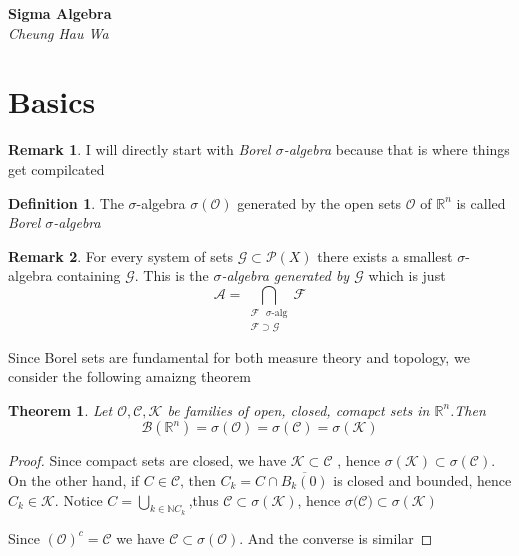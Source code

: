\documentclass{article}
\newtheorem{theorem}{Theorem}[section]
\theoremstyle{definition}
\newtheorem{definition}{Definition}[section]
\theoremstyle{definition}
\newtheorem*{remark}{Remark}
\newcommand{\m}[1]{$ #1 $}
\begin{document}
	

\begin{titlepage}
   \begin{center}
      \Large\textbf{Sigma Algebra}\\
      \large\textit{Cheung Hau Wa}
   \end{center}
\end{titlepage}
\section{Basics}
\begin{remark}
	I will directly start with \textit{Borel $\sigma$-algebra} because that is where things get compilcated
\end{remark}
\begin{definition}
	The $\sigma$-algebra $\sigma(\mathscr{O})$ generated by the open sets $\mathscr{O}$ of $\mathbb{R}^n$ is called \textit{Borel $\sigma$-algebra}
\end{definition}
\begin{remark}
	For every system of sets $\mathscr{G} \subset \mathscr{P}(X)$ there exists a smallest $\sigma$-algebra containing $\mathscr{G}$. This is the \textit{$\sigma$-algebra generated by $\mathscr{G}$} which is just \begin{equation*}
		\mathscr{A} = \bigcap_{\substack{\mathscr{F} \text{ }\sigma\text{-alg} \\ \mathscr{F} \supset \mathscr{G}}} \mathscr{F}
	\end{equation*}
\end{remark}
	
Since Borel sets are fundamental for both measure theory and topology, we consider the following amaizng theorem
\begin{theorem}
	Let $\mathscr{O,C,K}$ be families of open, closed, comapct sets in $\mathbb{R}^n$.Then 
	\begin{equation*}
		\mathscr{B}(\mathbb{R}^n) = \sigma(\mathscr{O}) = \sigma(\mathscr{C}) = \sigma(\mathscr{K})
	\end{equation*}
\end{theorem}
\begin{proof}
	Since compact sets are closed, we have $\mathscr{K} \subset \mathscr{C}$ , hence $\sigma(\mathscr{K}) \subset \sigma(\mathscr{C})$. On the other hand, if $C \in \mathscr{C} \text{, then } C_k = C \cap \overline{B_k(0)} $ is closed and bounded, hence $C_k \in \mathscr{K}$. Notice \m{C = \bigcup_{k \in \mathbb{N} C_k}},thus \m{\mathscr{C} \subset \sigma(\mathscr{K})}, hence \m{\sigma(\mathscr{C)} \subset \sigma(\mathscr{K})}

	Since \m{(\mathscr{O})^c=\mathscr{C}} we have \m{\mathscr{C} \subset \sigma(\mathscr{O})}.
	And the converse is similar
\end{proof}
\end{document}

